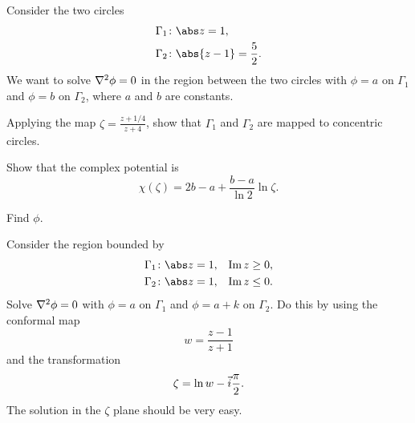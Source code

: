 \documentclass{phys151}
\begin{document}
\begin{problem}
  Consider the two circles
  \begin{align*}
    \Gamma_1 &\colon \abs z = 1, \\
    \Gamma_2 &\colon \abs{z-1} = \frac 5 2.
  \end{align*}
  We want to solve \(\mathop{}\!\nabla^2\phi = 0\) in the region between the two circles with
  \(\phi=a\) on \(\Gamma_1\) and \(\phi=b\) on \(\Gamma_2\), where \(a\) and
  \(b\) are constants.
  \begin{subproblems}
  \item Applying the map \(\zeta = \frac {z+1/4} {z+4}\), show that
    \(\Gamma_1\) and \(\Gamma_2\) are mapped to concentric circles.
  \item Show that the complex potential is
    \[
      \chi(\zeta) = 2b-a + \frac {b-a} {\ln 2} \ln \zeta.
    \]
  \item Find \(\phi\).
  \end{subproblems}
\end{problem}

\begin{solution}

\end{solution}

\begin{problem}
  Consider the region bounded by
  \begin{align*}
    \Gamma_1 &\colon \abs z = 1, & \Im z &\ge 0, \\
    \Gamma_2 &\colon \abs z = 1, & \Im z &\le 0.
  \end{align*}
  Solve \(\mathop{}\!\nabla^2\phi=0\) with \(\phi=a\) on \(\Gamma_1\) and \(\phi=a+k\) on
  \(\Gamma_2\).  Do this by using the conformal map
  \[
    w = \frac {z-1}{z+1}
  \]
  and the transformation
  \[
    \zeta = \ln w - \vec i \frac \pi 2.
  \]
  The solution in the \(\zeta\) plane should be very easy.
\end{problem}

\begin{solution}

\end{solution}
\end{document}

